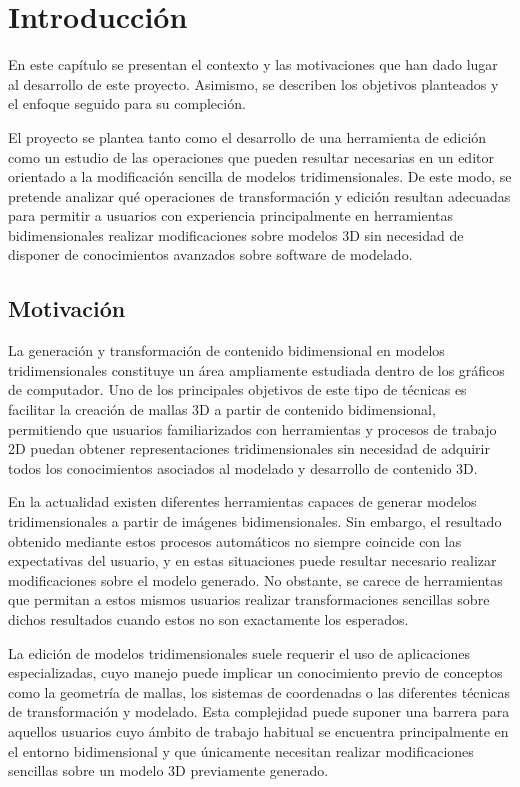 \chapter{Introducción}
\label{cap:introduccion}

En este capítulo se presentan el contexto y las motivaciones que han dado lugar al desarrollo de este proyecto. Asimismo, se describen los objetivos planteados y el enfoque seguido para su compleción.

El proyecto se plantea tanto como el desarrollo de una herramienta de edición como un estudio de las operaciones que pueden resultar necesarias en un editor orientado a la modificación sencilla de modelos tridimensionales. De este modo, se pretende analizar qué operaciones de transformación y edición resultan adecuadas para permitir a usuarios con experiencia principalmente en herramientas bidimensionales realizar modificaciones sobre modelos 3D sin necesidad de disponer de conocimientos avanzados sobre software de modelado.

\section{Motivación}

La generación y transformación de contenido bidimensional en modelos tridimensionales constituye un área ampliamente estudiada dentro de los gráficos de computador. Uno de los principales objetivos de este tipo de técnicas es facilitar la creación de mallas 3D a partir de contenido bidimensional, permitiendo que usuarios familiarizados con herramientas y procesos de trabajo 2D puedan obtener representaciones tridimensionales sin necesidad de adquirir todos los conocimientos asociados al modelado y desarrollo de contenido 3D.

En la actualidad existen diferentes herramientas capaces de generar modelos tridimensionales a partir de imágenes bidimensionales. Sin embargo, el resultado obtenido mediante estos procesos automáticos no siempre coincide con las expectativas del usuario, y en estas situaciones puede resultar necesario realizar modificaciones sobre el modelo generado. No obstante, se carece de herramientas que permitan a estos mismos usuarios realizar transformaciones sencillas sobre dichos resultados cuando estos no son exactamente los esperados.

La edición de modelos tridimensionales suele requerir el uso de aplicaciones especializadas, cuyo manejo puede implicar un conocimiento previo de conceptos como la geometría de mallas, los sistemas de coordenadas o las diferentes técnicas de transformación y modelado. Esta complejidad puede suponer una barrera para aquellos usuarios cuyo ámbito de trabajo habitual se encuentra principalmente en el entorno bidimensional y que únicamente necesitan realizar modificaciones sencillas sobre un modelo 3D previamente generado.

